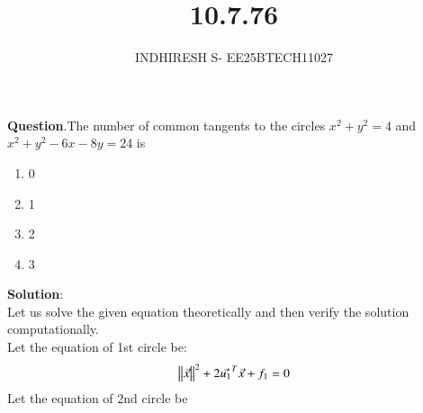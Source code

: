 \documentclass[journal]{IEEEtran}
\theoremstyle{remark}
\begin{document}

\onecolumn

\title{10.7.76}
\author{INDHIRESH S- EE25BTECH11027}
\maketitle


\renewcommand{\thefigure}{\theenumi}
\renewcommand{\thetable}{\theenumi}

\textbf{Question}.The number of common tangents to the circles $x^2 +y^2 = 4$ and $x^2 +y^2 -6x-8y = 24$ is
\begin{enumerate}
    \item 0
    \item 1
    \item 2
    \item 3
\end{enumerate}
\textbf{Solution}:\\
Let us solve the given equation theoretically and then verify the solution computationally. \\
Let the equation of 1st circle be:
\begin{align}
 \left\lVert\Vec{x}\right\rVert^2+2\Vec{u_1}^T\Vec{x}+f_1=0
\end{align}
Let the equation of 2nd circle be 
\end{document}
